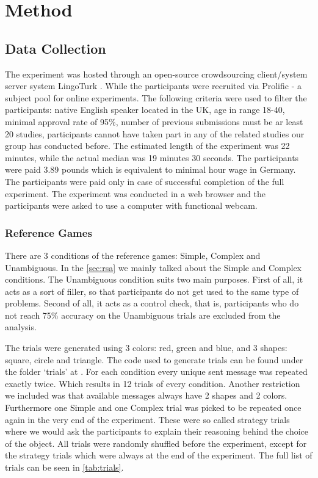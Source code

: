 ﻿\chapter{Method}

\section{Data Collection}
\label{sec:data}
The experiment was hosted through an open-source crowdsourcing client/system server system LingoTurk \cite{lingoturk}.
While the participants were recruited via Prolific \cite{prolific} - a subject pool for online experiments. The following criteria were used to filter the participants: native English speaker located in the UK, age in range 18-40, minimal approval rate of 95\%, number of previous submissions must be ar least 20 studies, participants cannot have taken part in any of the related studies our group has conducted before. The estimated length of the experiment was 22 minutes, while the actual median was 19 minutes 30 seconds. The participants were paid 3.89 pounds which is equivalent to minimal hour wage in Germany. The participants were paid only in case of successful completion of the full experiment. The experiment was conducted in a web browser and the participants were asked to use a computer with functional webcam. 


\subsection{Reference Games}
\label{sec:data:ref_games}
There are 3 conditions of the reference games: Simple, Complex and Unambiguous. In the \autoref{sec:rsa} we mainly talked about the Simple and Complex conditions. The Unambiguous condition suits two main purposes. First of all, it acts as a sort of filler, so that participants do not get used to the same type of problems. Second of all, it acts as a control check, that is, participants who do not reach 75\% accuracy on the Unambiguous trials are excluded from the analysis.

The trials were generated using 3 colors: red, green and blue, and 3 shapes: square, circle and triangle. The code used to generate trials can be found under the folder `trials' at \cite{github}. For each condition every unique sent message was repeated exactly twice. Which results in 12 trials of every condition. Another restriction we included was that available messages always have 2 shapes and 2 colors. Furthermore one Simple and one Complex trial was picked to be repeated once again in the very end of the experiment. These were so called strategy trials where we would ask the participants to explain their reasoning behind the choice of the object. All trials were randomly shuffled before the experiment, except for the strategy trials which were always at the end of the experiment. The full list of trials can be seen in \autoref{tab:trials}. 

